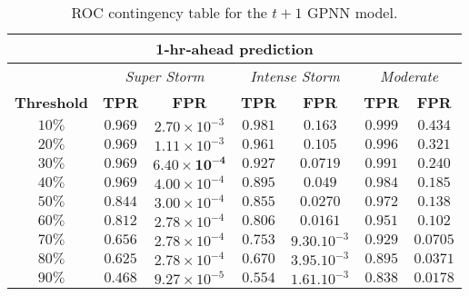 \begin{table}[ht]
	\centering
	\caption{ROC contingency table for the $t+1$ GPNN model.}
	\label{table:rocgpnn1h}
	\begin{tabular}{c| c c | c c | c c}
		\hline
		\multicolumn{7}{c}{\textbf{1‐hr‐ahead prediction}} \\ 
		\hline
		 & \multicolumn{2}{c}{\textit{Super Storm}} & \multicolumn{2}{c}{\textit{Intense Storm}} & \multicolumn{2}{c}{\textit{Moderate}} \\ 
		\hline
		\textbf{Threshold} & \textbf{TPR} & \textbf{FPR} & \textbf{TPR} & \textbf{FPR} & \textbf{TPR} & \textbf{FPR} \\ 
		\hline
		$10\%$ & $0.969$ & $2.70\times10^{-3}$ & $0.981$ & $0.163$ & $0.999$ &$ 0.434$ \\ 
		$20\%$ & $0.969$ & $1.11\times10^{-3}$ & $0.961$ & $0.105$ & $0.996$ & $0.321$ \\ 
		$30\%$ & $\mathbf{0.969}$ & $\mathbf{6.40\times10^{-4}}$ & $\mathbf{0.927}$ & $\mathbf{0.0719}$ & $0.991$ & $0.240$ \\ 
		$40\%$ & $0.969$ & $4.00\times10^{-4}$ & $0.895$ & $0.049$ & $0.984$ & $0.185$ \\ 
		$50\%$ & $0.844$ & $3.00\times10^{-4}$ & $0.855$ & $0.0270$ & $0.972$ & $0.138$ \\ 
		$60\%$ & $0.812$ & $2.78\times10^{-4}$ & $0.806$ & $0.0161$ & $0.951$ & $0.102$ \\ 
		$70\%$ & $0.656$ & $2.78\times10^{-4}$ & $0.753$ & $9.30.10^{-3}$ & $\mathbf{0.929}$ & $\mathbf{0.0705}$ \\ 
		$80\%$ & $0.625$ & $2.78\times10^{-4}$ & $0.670$ & $3.95.10^{-3}$ & $0.895$ & $0.0371$ \\ 
		$90\%$ & $0.468$ & $9.27\times10^{-5}$ & $0.554$ & $1.61.10^{-3}$ & $0.838$ & $0.0178$\\
		\hline
	\end{tabular}
	
\end{table}

